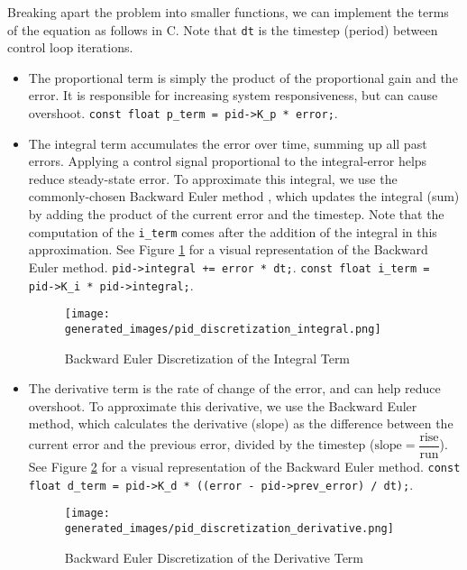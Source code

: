 \documentclass[main.tex]{subfiles}
\begin{document}
\noindent Breaking apart the problem into smaller functions, we can implement the terms of the equation as follows in C. Note that \texttt{dt} is the timestep (period) between control loop iterations.
\begin{itemize}

    \item The proportional term is simply the product of the proportional gain and the error. It is responsible for increasing system responsiveness, but can cause overshoot. \newline
    \texttt{const float p\_term = pid->K\_p * error;}.
    
    \item The integral term accumulates the error over time, summing up all past errors. Applying a control signal proportional to the integral-error helps reduce steady-state error. To approximate this integral, we use the commonly-chosen Backward Euler method \cite{AbramovitchPID}, which updates the integral (sum) by adding the product of the current error and the timestep. Note that the computation of the \texttt{i\_term} comes after the addition of the integral in this approximation. See Figure \ref{fig:pid-backward-euler-integral} for a visual representation of the Backward Euler method.
    \newline
    \texttt{pid->integral += error * dt;}. \newline
    \texttt{const float i\_term = pid->K\_i * pid->integral;}.
    \begin{figure}[H]
        \centering
        \texttt{[image: generated\_images/pid\_discretization\_integral.png]}
        \caption{Backward Euler Discretization of the Integral Term}
        \label{fig:pid-backward-euler-integral}
    \end{figure}

    \item The derivative term is the rate of change of the error, and can help reduce overshoot. To approximate this derivative, we use the Backward Euler method, which calculates the derivative (slope) as the difference between the current error and the previous error, divided by the timestep ($\text{slope} =  \dfrac{\text{rise}}{\text{run}}$). See Figure \ref{fig:pid-backward-euler-derivative} for a visual representation of the Backward Euler method.
    \newline
    \texttt{const float d\_term = pid->K\_d * ((error - pid->prev\_error) / dt);}.
    \begin{figure}[H]
        \centering
        \texttt{[image: generated\_images/pid\_discretization\_derivative.png]}
        \caption{Backward Euler Discretization of the Derivative Term}
        \label{fig:pid-backward-euler-derivative}
    \end{figure}

\end{itemize}
\end{document}
